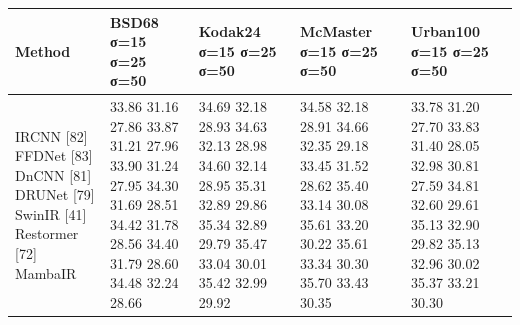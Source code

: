 \begin{tabular}{lllll}
\toprule
Method & BSD68 σ=15 σ=25 σ=50 & Kodak24 σ=15 σ=25 σ=50 & McMaster σ=15 σ=25 σ=50 & Urban100 σ=15 σ=25 σ=50 \\
\midrule
IRCNN [82] FFDNet [83] DnCNN [81] DRUNet [79] SwinIR [41] Restormer [72] MambaIR & 33.86 31.16 27.86 33.87 31.21 27.96 33.90 31.24 27.95 34.30 31.69 28.51 34.42 31.78 28.56 34.40 31.79 28.60 34.48 32.24 28.66 & 34.69 32.18 28.93 34.63 32.13 28.98 34.60 32.14 28.95 35.31 32.89 29.86 35.34 32.89 29.79 35.47 33.04 30.01 35.42 32.99 29.92 & 34.58 32.18 28.91 34.66 32.35 29.18 33.45 31.52 28.62 35.40 33.14 30.08 35.61 33.20 30.22 35.61 33.34 30.30 35.70 33.43 30.35 & 33.78 31.20 27.70 33.83 31.40 28.05 32.98 30.81 27.59 34.81 32.60 29.61 35.13 32.90 29.82 35.13 32.96 30.02 35.37 33.21 30.30 \\
\bottomrule
\end{tabular}
